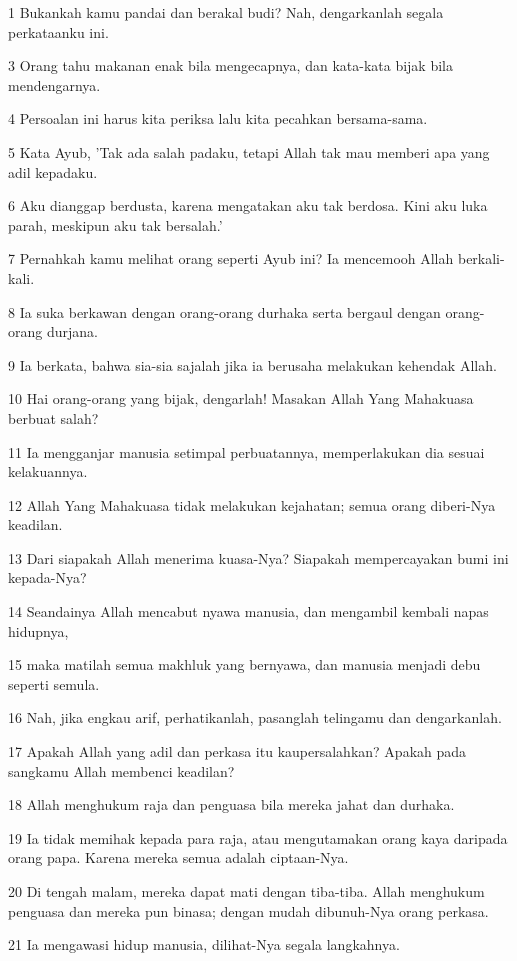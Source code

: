 \par 1 Bukankah kamu pandai dan berakal budi? Nah, dengarkanlah segala perkataanku ini.
\par 3 Orang tahu makanan enak bila mengecapnya, dan kata-kata bijak bila mendengarnya.
\par 4 Persoalan ini harus kita periksa lalu kita pecahkan bersama-sama.
\par 5 Kata Ayub, 'Tak ada salah padaku, tetapi Allah tak mau memberi apa yang adil kepadaku.
\par 6 Aku dianggap berdusta, karena mengatakan aku tak berdosa. Kini aku luka parah, meskipun aku tak bersalah.'
\par 7 Pernahkah kamu melihat orang seperti Ayub ini? Ia mencemooh Allah berkali-kali.
\par 8 Ia suka berkawan dengan orang-orang durhaka serta bergaul dengan orang-orang durjana.
\par 9 Ia berkata, bahwa sia-sia sajalah jika ia berusaha melakukan kehendak Allah.
\par 10 Hai orang-orang yang bijak, dengarlah! Masakan Allah Yang Mahakuasa berbuat salah?
\par 11 Ia mengganjar manusia setimpal perbuatannya, memperlakukan dia sesuai kelakuannya.
\par 12 Allah Yang Mahakuasa tidak melakukan kejahatan; semua orang diberi-Nya keadilan.
\par 13 Dari siapakah Allah menerima kuasa-Nya? Siapakah mempercayakan bumi ini kepada-Nya?
\par 14 Seandainya Allah mencabut nyawa manusia, dan mengambil kembali napas hidupnya,
\par 15 maka matilah semua makhluk yang bernyawa, dan manusia menjadi debu seperti semula.
\par 16 Nah, jika engkau arif, perhatikanlah, pasanglah telingamu dan dengarkanlah.
\par 17 Apakah Allah yang adil dan perkasa itu kaupersalahkan? Apakah pada sangkamu Allah membenci keadilan?
\par 18 Allah menghukum raja dan penguasa bila mereka jahat dan durhaka.
\par 19 Ia tidak memihak kepada para raja, atau mengutamakan orang kaya daripada orang papa. Karena mereka semua adalah ciptaan-Nya.
\par 20 Di tengah malam, mereka dapat mati dengan tiba-tiba. Allah menghukum penguasa dan mereka pun binasa; dengan mudah dibunuh-Nya orang perkasa.
\par 21 Ia mengawasi hidup manusia, dilihat-Nya segala langkahnya.
